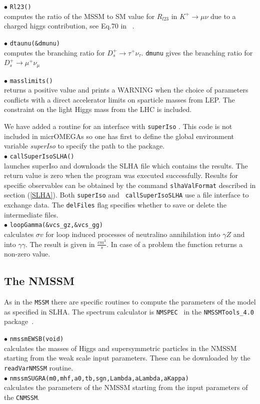 \documentclass[12pt,a4paper]{article}
\begin{document}
\noi$\bullet$ \verb|Rl23()|\\
computes the ratio of the MSSM to SM value for $R_{l23}$ in $K^+\rightarrow \mu\nu$  due to a  charged higgs contribution, see Eq.70 in ~\cite{Belanger:2013oya}. 

\noi$\bullet$ \verb|dtaunu(&dmunu)|\\
computes the branching ratio  for ${D}_s^+\rightarrow\tau^+\nu_\tau$. \verb|dmunu| 
gives  the branching ratio  for ${D}_s^+\rightarrow\mu^+\nu_\mu$

 
\noi$\bullet$ \verb|masslimits()|\\
returns a positive value  and
 prints a WARNING when the choice of parameters conflicts with a
direct accelerator limits on sparticle masses from LEP.
The constraint on the light Higgs mass from the LHC is included.  

We have added a routine for an interface with {\tt superIso}
\cite{Arbey:2011zz}. This code is not 
included in micrOMEGAs so one has first to define 
the global environment  variable {\it superIso} 
to specify the path to the package.\\ 
\noi$\bullet$ \verb|callSuperIsoSLHA()|\\
launches superIso and downloads the SLHA file which  contains the results. The
return value is zero when the program was  executed successfully.  Results
for specific  observables can be obtained by the command {\tt slhaValFormat}
described in  section (\ref{SLHA}).  Both {\tt superIso} and {\tt
callSuperIsoSLHA} use a file interface to exchange data. The {\tt delFiles} flag specifies whether
to save or delete the intermediate files.\\
\noi$\bullet$ \verb|loopGamma(&vcs_gz,&vcs_gg)|\\
calculates $\sigma v$ for  loop induced processes of neutralino
annihilation into $\gamma Z$ and into $\gamma \gamma$. The result is given in  
$\frac{cm^3}{s}$. In case of a problem the function returns a non-zero value. 

\subsection{The NMSSM}

As in the {\tt MSSM} there are specific routines to compute the  
parameters of the model as  specified in SLHA. The spectrum calculator is \verb|NMSPEC|~\cite{Ellwanger:2006rn}
 in the \verb|NMSSMTools_4.0| package~\cite{nmssmtools}.

\noindent$\bullet$ \verb|nmssmEWSB(void)|\\
calculates the masses of Higgs and supersymmetric particles in the NMSSM
starting from the weak scale input parameters. These  can be downloaded by the 
{\tt readVarNMSSM} routine.~\cite{Ellwanger:2005dv}\\   
\noindent$\bullet$ \verb|nmssmSUGRA(m0,mhf,a0,tb,sgn,Lambda,aLambda,aKappa)|\\
calculates the parameters of the NMSSM starting from the input parameters of 
the \verb|CNMSSM|.
\end{document}
